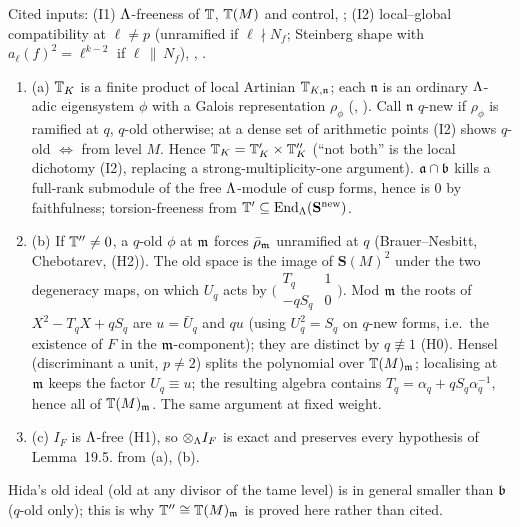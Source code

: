\begin{outline}
Cited inputs: (I1) $\Lambda$-freeness of $\mathbb{T}$, $\mathbb{T}(M)$ and control, \cite[Thm~3.1, Cor.~3.2, p.~250]{Hi86b} \stcited; (I2) local--global
compatibility at $\ell\ne p$ (unramified if $\ell\nmid N_f$; Steinberg shape with $a_\ell(f)^2=\ell^{k-2}$ if $\ell\,\|\,N_f$),
\cite[Thm~3.1]{DDT97}, \cite[Th.~(A)]{Car86} \stcited.
\begin{enumerate}[label=(\arabic*)]
\item (a) $\mathbb{T}_K$ is a finite product of local Artinian $\mathbb{T}_{K,\mathfrak n}$; each $\mathfrak n$ is an ordinary $\Lambda$-adic eigensystem $\phi$ with a
  Galois representation $\rho_\phi$ (\cite[Thm~2.1]{Hi86a}, \stcited). Call $\mathfrak n$ $q$-new if $\rho_\phi$ is ramified at $q$, $q$-old
  otherwise; at a dense set of arithmetic points (I2) shows $q$-old $\iff$ from level $M$. Hence $\mathbb{T}_K=\mathbb{T}'_K\times\mathbb{T}''_K$ (``not both'' is the
  local dichotomy (I2), replacing a strong-multiplicity-one argument). $\mathfrak{a}\cap\mathfrak{b}$ kills a full-rank submodule of the free $\Lambda$-module of
  cusp forms, hence is $0$ by faithfulness; torsion-freeness from $\mathbb{T}'\subseteq\operatorname{End}_\Lambda(\mathbf S^{\rm new})$. \stpmc
\item (b) If $\mathbb{T}''\ne0$, a $q$-old $\phi$ at $\mathfrak{m}$ forces $\bar\rho_{\mathfrak{m}}$ unramified at $q$ (Brauer--Nesbitt, Chebotarev, (H2)). The old space is the image
  of $\mathbf S(M)^2$ under the two degeneracy maps, on which $U_q$ acts by $\big(\begin{smallmatrix}T_q&1\\-qS_q&0\end{smallmatrix}\big)$. Mod $\mathfrak{m}$ the
  roots of $X^2-T_qX+qS_q$ are $u=\bar U_q$ and $qu$ (using $U_q^2=S_q$ on $q$-new forms, i.e.\ the existence of $F$ in the $\mathfrak{m}$-component);
  they are distinct by $q\not\equiv1$ (H0). Hensel (discriminant a unit, $p\ne2$) splits the polynomial over $\mathbb{T}(M)_{\mathfrak{m}}$; localising at $\mathfrak{m}$
  keeps the factor $U_q\equiv u$; the resulting algebra contains $T_q=\alpha_q+qS_q\alpha_q^{-1}$, hence all of $\mathbb{T}(M)_{\mathfrak{m}}$. The same argument
  at fixed weight. \stpmc
\item (c) $I_F$ is $\Lambda$-free (H1), so $\otimes_\Lambda I_F$ is exact and preserves every hypothesis of Lemma~19.5. \stproved{} from (a), (b).
\end{enumerate}
Hida's old ideal \cite[(3.4a--d)]{Hi86b} (old at any divisor of the tame level) is in general smaller than $\mathfrak{b}$ ($q$-old only); this is why
$\mathbb{T}''\cong\mathbb{T}(M)_{\mathfrak{m}}$ is proved here rather than cited.
\end{outline}

